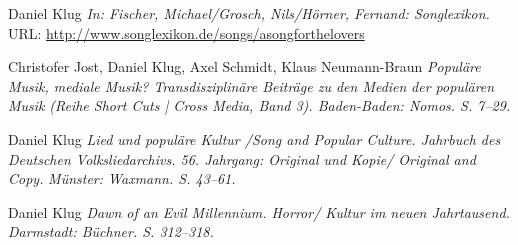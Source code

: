 \documentclass[9pt]{article}
\begin{document}
\newline\noindent Daniel Klug
\newline\noindent\emph{In: Fischer, Michael/Grosch, Nils/Hörner, Fernand: Songlexikon.}
\newline\noindent URL: \href{http://www.songlexikon.de/songs/asongforthelovers}{http://www.songlexikon.de/songs/asongforthelovers}
\bigskip


\vspace{-0.03in}
\newline{}
\newline{}\vspace{-0.03in}
\newline{} 
\newline\noindent Christofer Jost, Daniel Klug, Axel Schmidt, Klaus Neumann-Braun
\newline\noindent\emph{Popul\"{a}re Musik, mediale Musik? Transdisziplin\"{a}re Beitr\"{a}ge zu den Medien}\vspace{-0.03in}
\newline\noindent\emph{der popul\"{a}ren Musik}
\newline\noindent\emph{(Reihe Short Cuts | Cross Media, Band 3). Baden-Baden: Nomos. S. 7--29.}
\bigskip

\pagebreak

\newline{} 
\newline\noindent Daniel Klug
\newline\noindent\emph{Lied und populäre Kultur /Song and Popular Culture. Jahrbuch des}\vspace{-0.03in}
\newline\noindent\emph{Deutschen Volksliedarchivs. 56. Jahrgang: Original und Kopie/ Original and Copy.}
\newline\noindent\emph{Münster: Waxmann. S. 43--61.}
\bigskip


\newline{} 
\newline\noindent Daniel Klug
\newline\noindent\emph{Dawn of an Evil Millennium. Horror/ Kultur im neuen Jahrtausend.}
\newline\noindent\emph{Darmstadt: Büchner. S. 312–318.}
\bigskip
\end{document}
